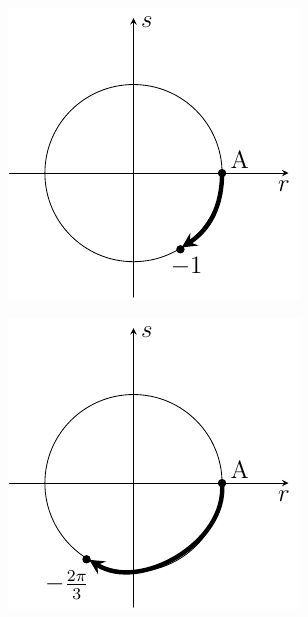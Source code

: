 \begin{minipage}{\textwidth}
\begin{minipage}{0.24\textwidth}
\end{minipage}
\begin{minipage}{0.24\textwidth}
     \centering
            \includegraphics[width=\textwidth]{Imagens/fig11.pdf}
\end{minipage}
\begin{minipage}{0.24\textwidth}
        \centering
            \includegraphics[width=\textwidth]{Imagens/fig12.pdf}
\end{minipage}
\end{minipage}

